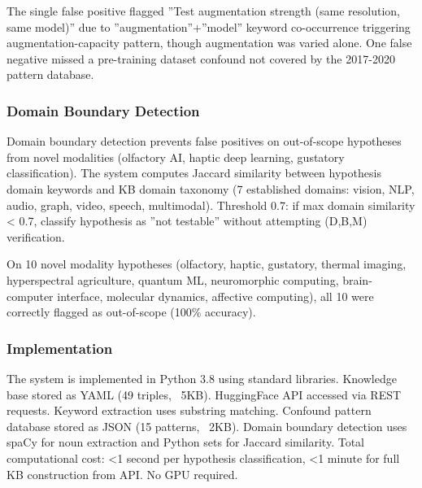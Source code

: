 The single false positive flagged ''Test augmentation strength (same resolution, same model)'' due to ''augmentation''+''model'' keyword co-occurrence triggering augmentation-capacity pattern, though augmentation was varied alone. One false negative missed a pre-training dataset confound not covered by the 2017-2020 pattern database.

\subsubsection{Domain Boundary Detection}

Domain boundary detection prevents false positives on out-of-scope hypotheses from novel modalities (olfactory AI, haptic deep learning, gustatory classification). The system computes Jaccard similarity between hypothesis domain keywords and KB domain taxonomy (7 established domains: vision, NLP, audio, graph, video, speech, multimodal). Threshold 0.7: if max domain similarity < 0.7, classify hypothesis as ''not testable'' without attempting (D,B,M) verification.

On 10 novel modality hypotheses (olfactory, haptic, gustatory, thermal imaging, hyperspectral agriculture, quantum ML, neuromorphic computing, brain-computer interface, molecular dynamics, affective computing), all 10 were correctly flagged as out-of-scope (100\% accuracy).

\subsubsection{Implementation}

The system is implemented in Python 3.8 using standard libraries. Knowledge base stored as YAML (49 triples, ~5KB). HuggingFace API accessed via REST requests. Keyword extraction uses substring matching. Confound pattern database stored as JSON (15 patterns, ~2KB). Domain boundary detection uses spaCy for noun extraction and Python sets for Jaccard similarity. Total computational cost: <1 second per hypothesis classification, <1 minute for full KB construction from API. No GPU required.
